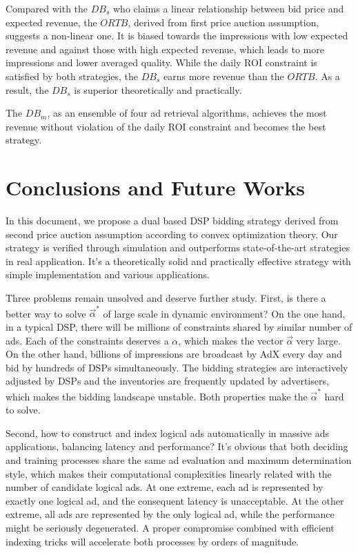 \documentclass{article}
\newcommand{\valpha}{\vec{\alpha}}
\begin{document}
Compared with the $DB_s$ who claims a linear relationship between bid price and expected revenue,
    the $ORTB$, derived from first price auction assumption, suggests a non-linear one.
It is biased towards the impressions with low expected revenue and against those with high expected revenue,
    which leads to more impressions and lower averaged quality.
While the daily ROI constraint is satisfied by both strategies,
    the $DB_s$ earns more revenue than the $ORTB$. As a result, the $DB_s$ is superior theoretically and practically.

The $DB_m$, as an ensemble of four ad retrieval algorithms,
    achieves the most revenue without violation of the daily ROI constraint and becomes the best strategy.

\section{Conclusions and Future Works}

In this document, we propose a dual based DSP bidding strategy
    derived from second price auction assumption according to convex optimization theory.
Our strategy is verified through simulation and outperforms state-of-the-art strategies in real application.
It's a theoretically solid and practically effective strategy with simple implementation and various applications.

Three problems remain unsolved and deserve further study.
First, is there a better way to solve $\valpha^*$ of large scale in dynamic environment?
On the one hand, in a typical DSP, there will be millions of constraints shared by similar number of ads.
Each of the constraints deserves a $\alpha$, which makes the vector $\valpha$ very large.
On the other hand, billions of impressions are broadcast by AdX every day and bid by hundreds of DSPs simultaneously.
The bidding strategies are interactively adjusted by DSPs and the inventories are frequently updated by advertisers,
    which makes the bidding landscape unstable.
Both properties make the $\valpha^*$ hard to solve.

Second, how to construct and index logical ads automatically in massive ads applications, balancing latency and performance?
It's obvious that both deciding and training processes share the same ad evaluation and maximum determination style,
    which makes their computational complexities linearly related with the number of candidate logical ads.
At one extreme, each ad is represented by exactly one logical ad, and the consequent latency is unacceptable.
At the other extreme, all ads are represented by the only logical ad, while the performance might be seriously degenerated.
A proper compromise combined with efficient indexing tricks will accelerate both processes by orders of magnitude.
\end{document}
